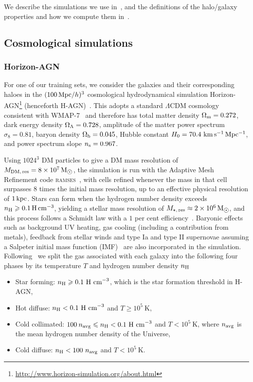 \documentclass[useAMS,usenatbib]{mnras}
\begin{document}
We describe the simulations we use in~, and the definitions of the halo/galaxy properties and how we compute them in~.


\subsection{Cosmological simulations}\label{sec:Cosmological simulations}

\subsubsection{Horizon-AGN}\label{sec:HAGN_simulation}

For one of our training sets, we consider the galaxies and their corresponding haloes in the $(100 {\rm \, Mpc}/h)^3$ cosmological hydrodynamical simulation Horizon-AGN\footnote{\url{http://www.horizon-simulation.org/about.html}} (henceforth H-AGN)~\citep{Dubois_2014}. This adopts a standard $\Lambda$CDM cosmology consistent with WMAP-7~\citep{Komatsu_2011} and therefore has total matter density $\Omega_{\rm m} = 0.272$, dark energy density $\Omega_{\rm \Lambda} = 0.728$, amplitude of the matter power spectrum $\sigma_8 = 0.81$, baryon density $\Omega_{\rm b} = 0.045$, Hubble constant $H_0 = 70.4 \, {\rm \, km \, s^{-1} \, Mpc^{-1}}$, and power spectrum slope $n_{\rm s} = 0.967$.

Using $1024^3$ \ac{DM} particles to give a \ac{DM} mass resolution of $M_{\rm DM, \, res} = 8 \times 10^7 {\rm \, M_{\sun}}$, the simulation is run with the Adaptive Mesh Refinement code \textsc{ramses}~\citep{Teyssier_2002}, with cells refined whenever the mass in that cell surpasses 8 times the initial mass resolution, up to an effective physical resolution of $1{\rm \, kpc}$. Stars can form when the hydrogen number density exceeds $n_{\rm H} \geq 0.1 {\rm \, H \, cm^{-3}}$, yielding a stellar mass resolution of $M_{\rm \star, \, res} \approx 2 \times 10^6 {\rm \, M_{\sun}}$, and this process follows a Schmidt law with a $1$ per cent efficiency~\citep{Rasera_2006}. Baryonic effects such as background UV heating, gas cooling (including a contribution from metals), feedback from stellar winds and type Ia and type II supernovae assuming a Salpeter initial mass function (IMF)~\citep{Dubois_2008,taysun2012a} are also incorporated in the simulation. Following~\cite{Dubois_2013} we split the gas associated with each galaxy into the following four phases by its temperature $T$ and hydrogen number density $n_{\rm H}$
\begin{itemize}
    \item Star forming: $n_{\rm H} \geq 0.1~\mathrm{H~cm}^{-3}$, which is the star formation threshold in H-AGN,
    \item Hot diffuse: $n_{\rm H} < 0.1~\mathrm{H~cm}^{-3}$ and $T\geq 10^5~\mathrm{K}$,
    \item Cold collimated: $100 \: n_{\rm avg} \leq n_{\rm H} < 0.1~\mathrm{H~cm}^{-3}$ and $T < 10^5~\mathrm{K}$, where $n_{\rm avg}$ is the mean hydrogen number density of the Universe,
    \item Cold diffuse: $n_{\rm H} < 100~n_{\rm avg}$ and $T < 10^5~\mathrm{K}$.
\end{itemize}
\end{document}
